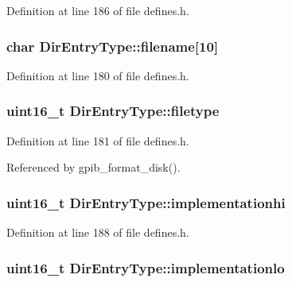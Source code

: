 Definition at line 186 of file defines.\-h.

\hypertarget{structDirEntryType_aa60fae0a6b7ba9c966cbcf46e555f396}{
\subsubsection[{filename}]{\setlength{\rightskip}{0pt plus 5cm}char Dir\-Entry\-Type\-::filename\mbox{[}10\mbox{]}}}\label{structDirEntryType_aa60fae0a6b7ba9c966cbcf46e555f396}


Definition at line 180 of file defines.\-h.

\hypertarget{structDirEntryType_ada14562440087858ebf04bc4c81eedd2}{
\subsubsection[{filetype}]{\setlength{\rightskip}{0pt plus 5cm}uint16\-\_\-t Dir\-Entry\-Type\-::filetype}}\label{structDirEntryType_ada14562440087858ebf04bc4c81eedd2}


Definition at line 181 of file defines.\-h.



Referenced by gpib\-\_\-format\-\_\-disk().

\hypertarget{structDirEntryType_a27a15eea3264d44c9e93e3be77093151}{
\subsubsection[{implementationhi}]{\setlength{\rightskip}{0pt plus 5cm}uint16\-\_\-t Dir\-Entry\-Type\-::implementationhi}}\label{structDirEntryType_a27a15eea3264d44c9e93e3be77093151}


Definition at line 188 of file defines.\-h.

\hypertarget{structDirEntryType_a8164d577c06fb7c312aaa4955d491449}{
\subsubsection[{implementationlo}]{\setlength{\rightskip}{0pt plus 5cm}uint16\-\_\-t Dir\-Entry\-Type\-::implementationlo}}\label{structDirEntryType_a8164d577c06fb7c312aaa4955d491449}


